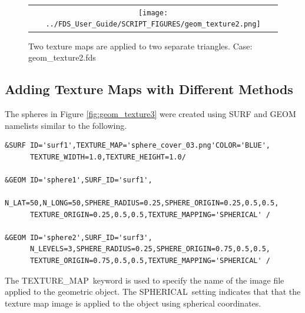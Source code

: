 \documentclass[11pt]{book}
\begin{document}
\begin{figure}[!ht]
\begin{center}
\begin{tabular}{c}
 \texttt{[image: ../FDS\_User\_Guide/SCRIPT\_FIGURES/geom\_texture2.png]}
  \end{tabular}
\end{center}
 \caption[Applying multiple texture maps to a {\ct GEOM} surface]{Two texture maps are applied to two separate triangles.  Case: {\ct geom\_texture2.fds}}
\label{fig:geom_texture2}
\end{figure}

\FloatBarrier

\subsection{Adding Texture Maps with Different Methods}

The spheres in Figure \ref{fig:geom_texture3} were created using {\ct SURF} and {\ct GEOM} namelists similar to the following.
\begin{lstlisting}
&SURF ID='surf1',TEXTURE_MAP='sphere_cover_03.png'COLOR='BLUE',
      TEXTURE_WIDTH=1.0,TEXTURE_HEIGHT=1.0/

&GEOM ID='sphere1',SURF_ID='surf1',
      N_LAT=50,N_LONG=50,SPHERE_RADIUS=0.25,SPHERE_ORIGIN=0.25,0.5,0.5,
      TEXTURE_ORIGIN=0.25,0.5,0.5,TEXTURE_MAPPING='SPHERICAL' /

&GEOM ID='sphere2',SURF_ID='surf3',
      N_LEVELS=3,SPHERE_RADIUS=0.25,SPHERE_ORIGIN=0.75,0.5,0.5,
      TEXTURE_ORIGIN=0.75,0.5,0.5,TEXTURE_MAPPING='SPHERICAL' /
\end{lstlisting}
The {\ct TEXTURE\_MAP}\ keyword is used to specify the name of the image file applied to the geometric object. The {\ct SPHERICAL}\ setting indicates that that the texture map image is applied to the object using spherical coordinates.
\end{document}
